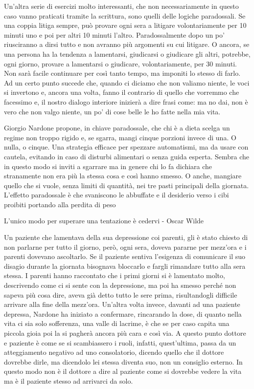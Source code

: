 \documentclass[12pt]{book} %
\begin{document}
\begin{mdframed}[linewidth=1pt]
Un'altra serie di esercizi molto interessanti, che non necessariamente in questo caso vanno
praticati tramite la scrittura, sono quelli delle logiche paradossali. Se una coppia litiga sempre, può provare ogni
sera a litigare volontariamente per 10 minuti uno e poi per altri 10 minuti l'altro.
Paradossalmente dopo un po' riusciranno a dirsi tutto e non avranno più argomenti su cui litigare. O ancora, se una
persona ha la tendenza a lamentarsi, giudicarsi o giudicare gli altri, potrebbe, ogni giorno, provare a lamentarsi o
giudicare, volontariamente, per 30 minuti. Non sarà facile continuare per così tanto tempo, ma imponiti lo stesso di
farlo. Ad un certo punto succede che, quando ci diciamo che non valiamo niente, le voci si invertono e, ancora una
volta, fanno il contrario di quello che vorremmo che facessimo e, il nostro dialogo interiore inizierà a dire frasi
come: ma no dai, non è vero che non valgo niente, un po' di cose belle le ho fatte nella mia vita. 

Giorgio Nardone propone, in chiave paradossale, che chi è a dieta scelga un regime non troppo rigido e, se sgarra, mangi cinque porzioni invece di una. O nulla, o cinque. Una strategia efficace per spezzare automatismi, ma da usare con cautela, evitando in caso di disturbi alimentari o senza guida esperta. Sembra che in questo modo si inviti a sgarrare ma in genere chi lo fa
dichiara che stranamente non era più la stessa cosa e così hanno smesso. O anche, mangiare quello che si vuole, senza
limiti di quantità, nei tre pasti principali della giornata. L'effetto paradossale è che
svaniscono le abbuffate e il desiderio verso i cibi proibiti portando alla perdita di peso

L'unico modo per superare una tentazione è cedervi - Oscar Wilde

Un paziente che lamentava della sua depressione coi parenti, gli è stato chiesto di non parlarne per tutto il giorno,
però, ogni sera, doveva pararne per mezz'ora e i parenti dovevano ascoltarlo. Se il paziente
sentiva l'esigenza di comunicare il suo disagio durante la giornata bisognava bloccarlo e fargli
rimandare tutto alla sera stessa. I parenti hanno raccontato che i primi giorni si è lamentato molto, descrivendo come
ci si sente con la depressione, ma poi ha smesso perché non sapeva più cosa dire, aveva già detto tutto le sere prima,
risultandogli difficile arrivare alla fine della mezz'ora. Un'altra volta
invece, davanti ad una paziente depressa, Nardone ha iniziato a confermare, rincarando la dose, di quanto nella vita ci
sia solo sofferenza, una valle di lacrime, è che se per caso capita una piccola gioia poi la si pagherà ancora più cara
e così via. A questo punto dottore e paziente è come se si scambiassero i ruoli, infatti,
quest'ultima, passa da un atteggiamento negativo ad uno consolatorio, dicendo quello che il
dottore dovrebbe dirle, ma dicendolo lei stessa diventa suo, non un consiglio esterno. In questo modo non è il dottore
a dire al paziente come si dovrebbe vedere la vita ma è il paziente stesso ad arrivarci da solo.


\end{mdframed}
\end{document}
